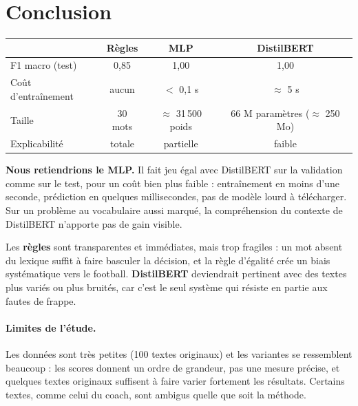\documentclass[11pt,a4paper]{article}
\begin{document}
\section{Conclusion}

\begin{center}
\begin{tabular}{lccc}
\toprule
 & Règles & MLP & DistilBERT \\
\midrule
F1 macro (test) & 0,85 & 1,00 & 1,00 \\
Coût d'entraînement & aucun & $<$ 0,1 s & $\approx$ 5 s \\
Taille & 30 mots & $\approx$ 31\,500 poids & 66 M paramètres ($\approx$ 250 Mo) \\
Explicabilité & totale & partielle & faible \\
\bottomrule
\end{tabular}
\end{center}

\textbf{Nous retiendrions le MLP.} Il fait jeu égal avec DistilBERT sur la validation comme sur le test, pour un coût bien plus faible : entraînement en moins d'une seconde, prédiction en quelques millisecondes, pas de modèle lourd à télécharger. Sur un problème au vocabulaire aussi marqué, la compréhension du contexte de DistilBERT n'apporte pas de gain visible.

Les \textbf{règles} sont transparentes et immédiates, mais trop fragiles : un mot absent du lexique suffit à faire basculer la décision, et la règle d'égalité crée un biais systématique vers le football. \textbf{DistilBERT} deviendrait pertinent avec des textes plus variés ou plus bruités, car c'est le seul système qui résiste en partie aux fautes de frappe.

\paragraph{Limites de l'étude.} Les données sont très petites (100 textes originaux) et les variantes se ressemblent beaucoup : les scores donnent un ordre de grandeur, pas une mesure précise, et quelques textes originaux suffisent à faire varier fortement les résultats. Certains textes, comme celui du coach, sont ambigus quelle que soit la méthode.
\end{document}
